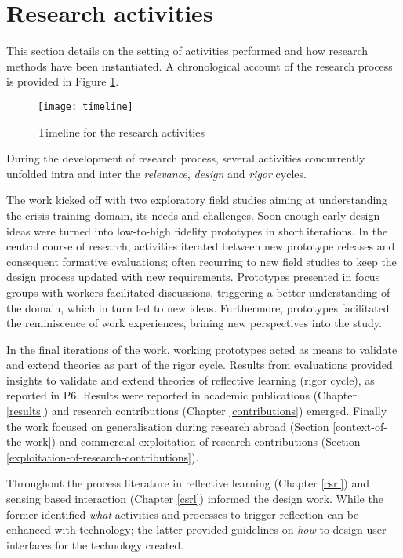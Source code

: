 \section{Research activities}\label{research-activities}

This section details on the setting of activities performed and how
research methods have been instantiated. A chronological account of the
research process is provided in Figure \ref{fig:research-activities}.

\begin{figure}[p]
    \centering
    \texttt{[image: timeline]}
    \caption{Timeline for the research activities}
    \label{fig:research-activities}
\end{figure}

During the development of research process, several activities
concurrently unfolded intra and inter the \emph{relevance},
\emph{design} and \emph{rigor} cycles.

The work kicked off with two exploratory field studies aiming at
understanding the crisis training domain, its needs and challenges. Soon
enough early design ideas were turned into low-to-high fidelity
prototypes in short iterations. In the central course of research,
activities iterated between new prototype releases and consequent
formative evaluations; often recurring to new field studies to keep the
design process updated with new requirements. Prototypes presented in
focus groups with workers facilitated discussions, triggering a better
understanding of the domain, which in turn led to new ideas.
Furthermore, prototypes facilitated the reminiscence of work
experiences, brining new perspectives into the study.

In the final iterations of the work, working prototypes acted as means
to validate and extend theories as part of the rigor cycle. Results from
evaluations provided insights to validate and extend theories of
reflective learning (rigor cycle), as reported in P6. Results were
reported in academic publications (Chapter \ref{results}) and research
contributions (Chapter \ref{contributions}) emerged. Finally the work
focused on generalisation during research abroad (Section
\ref{context-of-the-work}) and commercial exploitation of research
contributions (Section \ref{exploitation-of-research-contributions}).

Throughout the process literature in reflective learning (Chapter
\ref{csrl}) and sensing based interaction (Chapter \ref{csrl}) informed
the design work. While the former identified \emph{what} activities and
processes to trigger reflection can be enhanced with technology; the
latter provided guidelines on \emph{how} to design user interfaces for
the technology created.

